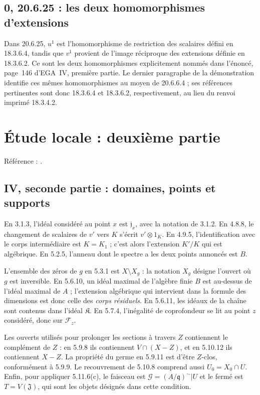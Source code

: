 \documentclass[11pt,a4paper]{article}
\begin{document}
\subsection{0, 20.6.25 : les deux homomorphismes d'extensions}
Dans 20.6.25, $u^1$ est l'homomorphisme de restriction des scalaires
défini en 18.3.6.4, tandis que $v^1$ provient de l'image réciproque
des extensions définie en 18.3.6.2. Ce sont les deux homomorphismes
explicitement nommés dans l'énoncé, page~146 d'EGA~IV, première
partie. Le dernier paragraphe de la démonstration identifie ces
mêmes homomorphismes au moyen de 20.6.6.4 ; ses références
pertinentes sont donc 18.3.6.4 et 18.3.6.2, respectivement,
au lieu du renvoi imprimé 18.3.4.2.

\section{Étude locale : deuxième partie}
\label{part:iv2}
Référence : \cite{EGAIV2}.
\subsection{IV, seconde partie : domaines, points et supports}
\label{note:iv2-domains}
En 3.1.3, l'idéal considéré au point $x$ est $\mathfrak j_x$, avec la
notation de 3.1.2. En 4.8.8, le changement de scalaires de $v'$ vers
$K$ s'écrit $v'\otimes1_K$. En 4.9.5, l'identification avec le corps
intermédiaire est $K=K_1$ ; c'est alors l'extension $K'/K$ qui est
algébrique. En 5.2.5, l'anneau dont le spectre a les deux points annoncés
est $B$.

L'ensemble des zéros de $g$ en 5.3.1 est $X\setminus X_g$ : la notation
$X_g$ désigne l'ouvert où $g$ est inversible. En 5.6.10, un idéal maximal
de l'algèbre finie $B$ est au-dessus de l'idéal maximal de $A$ ; l'extension
algébrique qui intervient dans la formule des dimensions est donc celle
des \emph{corps résiduels}. En 5.6.11, les idéaux de la chaîne sont contenus
dans l'idéal $\mathfrak K$. En 5.7.4, l'inégalité de coprofondeur se lit
au point $z$ considéré, donc sur $\mathscr F_z$.

Les ouverts utilisés pour prolonger les sections à travers $Z$ contiennent
le complément de $Z$ : en 5.9.8 ils contiennent $V\cap(X-Z)$, et en 5.10.12
ils contiennent $X-Z$. La propriété du germe en 5.9.11 est d'être
$Z$-clos, conformément à 5.9.9. Le recouvrement de 5.10.8 comprend aussi
$U_0=X_0\cap U$. Enfin, pour appliquer 5.11.6(c), le faisceau est
$\mathcal G=(A/\mathfrak q)^\sim|U$ et le fermé est $T=V(\mathfrak J)$,
qui sont les objets désignés dans cette condition.
\end{document}
